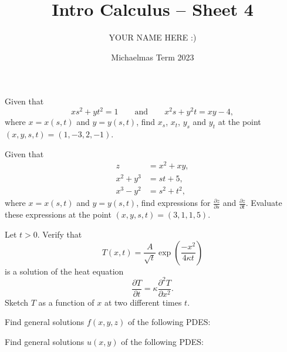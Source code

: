 \documentclass[answers]{exam}
\title{Intro Calculus -- Sheet 4}
\author{YOUR NAME HERE :)}
\date{Michaelmas Term 2023}
\newcommand*{\bump}{\vspace{1em}\phantom{}\vspace{-1.75em}}
\begin{document}
\maketitle
\begin{questions}

\question%
Given that \[
	xs^2+yt^2=1 \qquad \text{and} \qquad x^2s+y^2t=xy-4,
\] where $x=x(s, t)$ and $y=y(s, t)$, find $x_{s}$, $x_{t}$, $y_{s}$ and $y_{t}$ at the point $(x, y, s, t)=(1,-3,2,-1)$.



\question%
Given that \begin{align*}
	z & =x^{2}+x y, \\
	x^{2}+y^{3} & =s t+5, \\
	x^{3}-y^{2} & =s^{2}+t^{2},
\end{align*} where $x=x(s, t)$ and $y=y(s, t)$, find expressions for $\frac{\partial z}{\partial s}$ and $\frac{\partial z}{\partial t}$. Evaluate these expressions at the point $(x, y, s, t)=(3,1,1,5)$.



\question%
Let $t>0$. Verify that \[ T(x, t)=\frac{A}{\sqrt{t}} \exp \left(\frac{-x^{2}}{4 \kappa t}\right) \] is a solution of the heat equation \[
	\frac{\partial T}{\partial t}=\kappa\frac{\partial^2T}{\partial x^2}.
\] Sketch $T$ as a function of $x$ at two different times $t$.



\question%
Find general solutions $f(x, y, z)$ of the following PDES:
\begin{parts}
\part%
\bump \[
	\frac{\partial^{3} f}{\partial z^{3}}=0;
\]

\part%
\bump \[
	\frac{\partial^{3} f}{\partial x \partial y \partial z}=0.
\]
\end{parts}



\question%
Find general solutions $u(x, y)$ of the following PDES:
\begin{parts}
\part%
\bump \[
	y \frac{\partial u}{\partial y}=u;
\]


\end{parts}
\end{questions}
\end{document}
